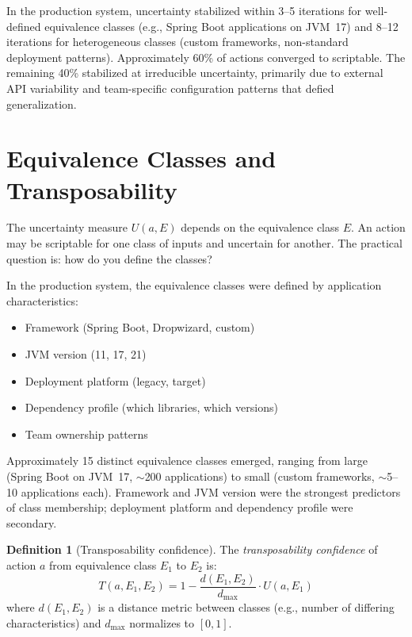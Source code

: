 \documentclass[11pt]{article}
\theoremstyle{definition}
\newtheorem{definition}{Definition}
\begin{document}
In the production system, uncertainty stabilized within 3--5 iterations
for well-defined equivalence classes (e.g., Spring Boot applications on
JVM~17) and 8--12 iterations for heterogeneous classes (custom
frameworks, non-standard deployment patterns). Approximately 60\% of
actions converged to scriptable. The remaining 40\% stabilized at
irreducible uncertainty, primarily due to external API variability and
team-specific configuration patterns that defied generalization.

\section{Equivalence Classes and Transposability}
\label{sec:equivalence}

The uncertainty measure $U(a, E)$ depends on the equivalence class $E$.
An action may be scriptable for one class of inputs and uncertain for
another. The practical question is: how do you define the classes?

In the production system, the equivalence classes were defined by
application characteristics:

\begin{itemize}
\item Framework (Spring Boot, Dropwizard, custom)
\item JVM version (11, 17, 21)
\item Deployment platform (legacy, target)
\item Dependency profile (which libraries, which versions)
\item Team ownership patterns
\end{itemize}

Approximately 15 distinct equivalence classes emerged, ranging from
large (Spring Boot on JVM~17, $\sim$200 applications) to small
(custom frameworks, $\sim$5--10 applications each). Framework and JVM
version were the strongest predictors of class membership; deployment
platform and dependency profile were secondary.

\begin{definition}[Transposability confidence]
\label{def:transposability}
The \emph{transposability confidence} of action $a$ from equivalence
class $E_1$ to $E_2$ is:
\[
T(a, E_1, E_2) = 1 - \frac{d(E_1, E_2)}{d_{\max}} \cdot U(a, E_1)
\]
where $d(E_1, E_2)$ is a distance metric between classes (e.g., number
of differing characteristics) and $d_{\max}$ normalizes to $[0, 1]$.
\end{definition}
\end{document}
